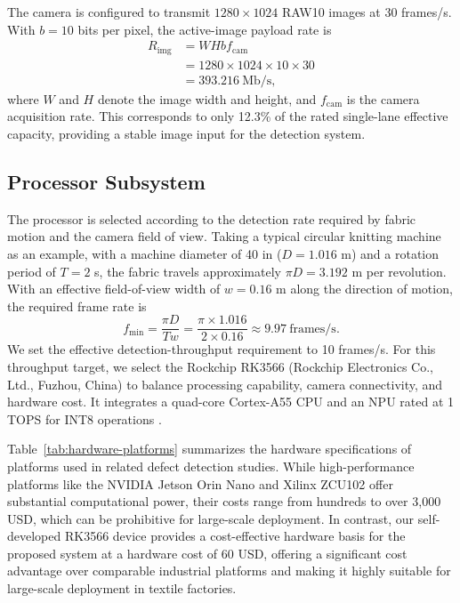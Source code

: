 \documentclass[journal]{IEEEtranTIE}
\begin{document}
The camera is configured to transmit $1280\times1024$ RAW10 images at 30 frames/s. With $b=10$ bits per pixel, the active-image payload rate is
\begin{equation}
\begin{aligned}
R_{\mathrm{img}} &= W H b f_{\mathrm{cam}} \\
&=1280\times1024\times10\times30 \\
&=393.216\ \mathrm{Mb/s},
\end{aligned}
\label{eq:serdes-bandwidth}
\end{equation}
where $W$ and $H$ denote the image width and height, and $f_{\mathrm{cam}}$ is the camera acquisition rate. This corresponds to only 12.3\% of the rated single-lane effective capacity, providing a stable image input for the detection system.

\subsection{Processor Subsystem}
\label{sec:coverage}
The processor is selected according to the detection rate required by fabric motion and the camera field of view. Taking a typical circular knitting machine as an example, with a machine diameter of 40 in ($D=1.016$ m) and a rotation period of $T=2$ s, the fabric travels approximately $\pi D=3.192$ m per revolution. With an effective field-of-view width of $w=0.16$ m along the direction of motion, the required frame rate is
\begin{equation}
f_{\min}=\frac{\pi D}{Tw}
=\frac{\pi\times1.016}{2\times0.16}
\approx9.97\ \mathrm{frames/s}.
\label{eq:coverage-rate}
\end{equation}
We set the effective detection-throughput requirement to 10 frames/s. For this throughput target, we select the Rockchip RK3566 (Rockchip Electronics Co., Ltd., Fuzhou, China) to balance processing capability, camera connectivity, and hardware cost. It integrates a quad-core Cortex-A55 CPU and an NPU rated at 1 TOPS for INT8 operations \cite{rockchiprk3566}.

Table~\ref{tab:hardware-platforms} summarizes the hardware specifications of platforms used in related defect detection studies. While high-performance platforms like the NVIDIA Jetson Orin Nano and Xilinx ZCU102 offer substantial computational power, their costs range from hundreds to over 3,000 USD, which can be prohibitive for large-scale deployment. In contrast, our self-developed RK3566 device provides a cost-effective hardware basis for the proposed system at a hardware cost of 60 USD, offering a significant cost advantage over comparable industrial platforms and making it highly suitable for large-scale deployment in textile factories.
\end{document}

